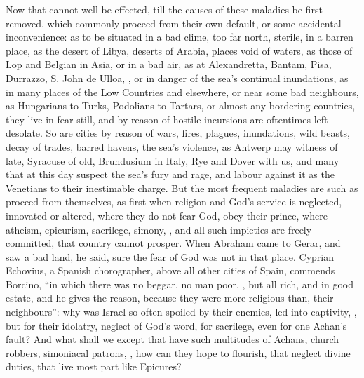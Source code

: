 Now that cannot well be effected, till the causes of these maladies be first
removed, which commonly proceed from their own default, or some accidental
inconvenience: as to be situated in a bad clime, too far north, sterile, in a
barren place, as the desert of Libya, deserts of Arabia, places void of waters,
as those of Lop and Belgian in Asia, or in a bad air, as at Alexandretta,
Bantam, Pisa, Durrazzo, S. John de Ulloa, \etc{}, or in danger of the sea's
continual inundations, as in many places of the Low Countries and elsewhere, or
near some bad neighbours, as Hungarians to Turks, Podolians to Tartars, or
almost any bordering countries, they live in fear still, and by reason of
hostile incursions are oftentimes left desolate. So are cities by reason
of wars, fires, plagues, inundations,
wild beasts, decay of trades, barred havens, the sea's
violence, as Antwerp may witness of late, Syracuse of old, Brundusium in Italy,
Rye and Dover with us, and many that at this day suspect the sea's fury and
rage, and labour against it as the Venetians to their inestimable charge. But
the most frequent maladies are such as proceed from themselves, as first when
religion and God's service is neglected, innovated or altered, where they do
not fear God, obey their prince, where atheism, epicurism, sacrilege, simony,
\etc{}, and all such impieties are freely committed, that country cannot
prosper. When Abraham came to Gerar, and saw a bad land, he said, sure the fear
of God was not in that place. Cyprian Echovius, a Spanish
chorographer, above all other cities of Spain, commends Borcino, \enquote{in which
there was no beggar, no man poor, \etc{}, but all rich, and in good estate, and
he gives the reason, because they were more religious than, their neighbours}:
why was Israel so often spoiled by their enemies, led into captivity, \etc{},
but for their idolatry, neglect of God's word, for sacrilege, even for one
Achan's fault? And what shall we except that have such multitudes of Achans,
church robbers, simoniacal patrons, \etc{}, how can they hope to flourish, that
neglect divine duties, that live most part like Epicures?

